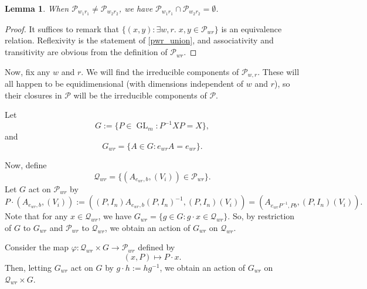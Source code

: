 \documentclass[12pt,psamsfonts]{article}
\DeclareMathOperator{\GL}{GL}
\newtheorem{lemma}[theorem]{Lemma}
\begin{document}
\begin{lemma}
    When \(\mathcal{P}_{w_1r_1} \neq \mathcal{P}_{w_2r_2}\), we have \(\mathcal{P}_{w_1r_1} \cap \mathcal{P}_{w_2r_2} = \emptyset\). 
\end{lemma}
\begin{proof}
    It suffices to remark that \(\{(x,y) : \exists w,r. \; x,y \in \mathcal{P}_{wr}\}\) is an equivalence relation.
    Reflexivity is the statement of \cref{pwr_union}, and associativity and transitivity are obvious from the definition of \(\mathcal{P}_{wr}\).
\end{proof}

Now, fix any \(w\) and \(r\).
We will find the irreducible components of \(\mathcal{P}_{w,r}\).
These will all happen to be equidimensional (with dimensions independent of \(w\) and \(r\)), so their closures in \(\mathcal{P}\) will be the irreducible components of \(\mathcal{P}\).
\par Let 
\[G := \{P \in \GL_m : P^{-1} X P = X\},\]
and
\[G_{wr} = \{A \in G : e_{wr}A = e_{wr}\}.\]
\par Now, define 
\[\mathcal{Q}_{wr} = \{(A_{e_{wr}, b}, (V_i)) \in \mathcal{P}_{wr}\}.\]
Let \(G\) act on \(\mathcal{P}_{wr}\) by
\[P \cdot (A_{e_{wr},b}, (V_i)) := ((P, I_n) A_{e_{wr}, b} (P, I_n)^{-1}, (P, I_n)(V_i)) = (A_{e_{wr} P^{-1}, Pb}, (P, I_n) (V_i)).\]
Note that for any \(x \in \mathcal{Q}_{wr}\), we have \(G_{wr} = \{g \in G : g \cdot x \in \mathcal{Q}_{wr}\}\).
So, by restriction of \(G\) to \(G_{wr}\) and \(\mathcal{P}_{wr}\) to \(\mathcal{Q}_{wr}\), we obtain an action of \(G_{wr}\) on \(\mathcal{Q}_{wr}\).
\par Consider the map \(\varphi : \mathcal{Q}_{wr} \times G \to \mathcal{P}_{wr}\) defined by
\[(x, P) \mapsto P \cdot x.\]
Then, letting \(G_{wr}\) act on \(G\) by \(g \cdot h := hg^{-1}\), we obtain an action of \(G_{wr}\) on \(\mathcal{Q}_{wr} \times G\).
\end{document}
